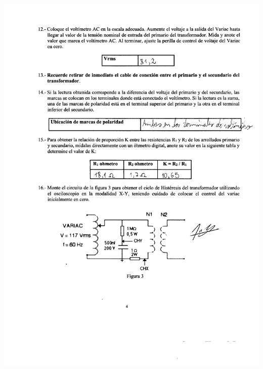 \documentclass[12pt]{article}
\begin{document}
	\includegraphics[width=16cm,height=21cm]{Img/lab_8_0003}\\
\end{document}
